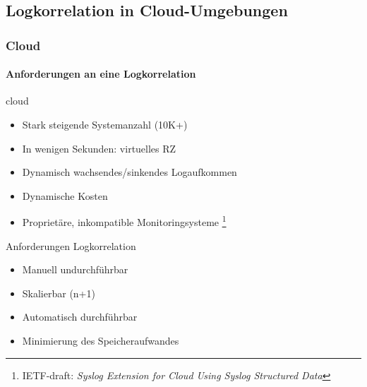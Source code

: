 \documentclass[10pt]{beamer} %
\begin{document}
\subsection{Logkorrelation in Cloud-Umgebungen}
\begin{frame}
\frametitle{Cloud}
\framesubtitle{Anforderungen an eine Logkorrelation}

    \begin{block}{cloud}
        \begin{itemize}
            \item Stark steigende Systemanzahl (10K+)
            \item In wenigen Sekunden: virtuelles RZ
            \item Dynamisch wachsendes/sinkendes Logaufkommen
            \item Dynamische Kosten
            \item Proprietäre, inkompatible Monitoringsysteme
            \footnote{IETF-draft: \textit{Syslog Extension for Cloud Using Syslog 
            Structured Data}}
        \end{itemize}
    \end{block}
    \pause
    \begin{block}{Anforderungen Logkorrelation}
        \begin{itemize}
            \item Manuell undurchführbar
            \item Skalierbar (n+1)
            \item Automatisch durchführbar
            \item Minimierung des Speicheraufwandes
        \end{itemize}
    \end{block}

\end{frame}
\end{document}
